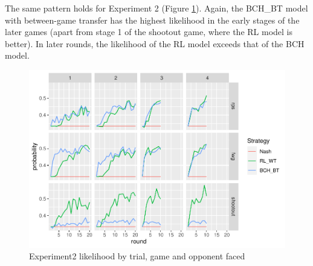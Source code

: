 \documentclass[smallextended]{svjour3}       %
\begin{document}
The same pattern holds for Experiment 2 (Figure
\ref{fig:exp2-lik-by-tr}). Again, the BCH\_BT model with between-game
transfer has the highest likelihood in the early stages of the later
games (apart from stage 1 of the shootout game, where the RL model is
better). In later rounds, the likelihood of the RL model exceeds that of
the BCH model.

\begin{figure}

{\centering \includegraphics[width=\textwidth]{CBB_files/figure-latex/exp2-lik-by-tr-1} 

}

\caption{Experiment2 likelihood by trial, game and opponent faced}\label{fig:exp2-lik-by-tr}
\end{figure}
\end{document}
